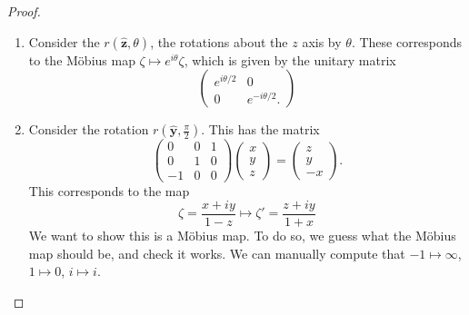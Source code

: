 \documentclass[a4paper]{article}
\begin{document}
\begin{proof}\leavevmode
  \begin{enumerate}
    \item Consider the $r(\hat{\mathbf{z}}, \theta)$, the rotations about the $z$ axis by $\theta$. These corresponds to the M\"obius map $\zeta \mapsto e^{i\theta} \zeta$, which is given by the unitary matrix
      \[
        \begin{pmatrix}
          e^{i\theta/2} & 0\\
          0 & e^{-i\theta/2}.
        \end{pmatrix}
      \]
    \item Consider the rotation $r(\hat{\mathbf{y}}, \frac{\pi}{2})$. This has the matrix
      \[
        \begin{pmatrix}
          0 & 0 & 1\\
          0 & 1 & 0\\
          -1 & 0 & 0
        \end{pmatrix}
        \begin{pmatrix}
          x\\y\\z
        \end{pmatrix}
        =
        \begin{pmatrix}
          z\\y\\-x
        \end{pmatrix}.
      \]
      This corresponds to the map
      \[
        \zeta = \frac{x + iy}{1 - z} \mapsto \zeta' = \frac{z + iy}{1 + x}
      \]
      We want to show this is a M\"obius map. To do so, we guess what the M\"obius map should be, and check it works. We can manually compute that $-1 \mapsto \infty$, $1 \mapsto 0$, $i \mapsto i$.
      \begin{center}
\end{center}
\end{enumerate}
\end{proof}
\end{document}
